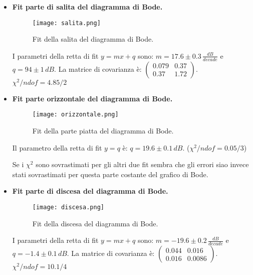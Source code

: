 \documentclass[10pt,a4paper]{article}
\begin{document}
\begin{itemize}
\item \textbf{Fit parte di salita del diagramma di Bode.}

\begin{figure}[!htb]
  \centering
  \texttt{[image: salita.png]}
\caption{Fit della salita del diagramma di Bode.}
\label{salita}
\end{figure}

I parametri della retta di fit $y = mx+q$ sono: $m = 17.6 \pm 0.3 \, \frac{dB}{decade}$ e $q = 94 \pm 1 \, dB$. La matrice di covarianza è:
$\left( \begin{array}{cc}
0.079 & 0.37 \\ 
0.37 & 1.72
\end{array} \right)$.\\
$\chi^2/ndof = 4.85/2$

\item \textbf{Fit parte orizzontale del diagramma di Bode.}

\begin{figure}[!htb]
  \centering
  \texttt{[image: orizzontale.png]}
\caption{Fit della parte piatta del diagramma di Bode.}
\label{orizz}
\end{figure}

Il parametro della retta di fit $y = q$ è: $q =19.6  \pm 0.1\, dB$. ($\chi^2/ndof = 0.05/3$) 

Se i $\chi^2$ sono sovrastimati per gli altri due fit sembra che gli errori siao invece stati sovrastimati per questa parte costante del grafico di Bode.


\item \textbf{Fit parte di discesa del diagramma di Bode.}

\begin{figure}[!htb]
  \centering
  \texttt{[image: discesa.png]}
\caption{Fit della discesa del diagramma di Bode.}
\label{discesa}
\end{figure}

I parametri della retta di fit $y = mx+q$ sono: $m = -19.6 \pm 0.2 \, \frac{dB}{decade}$ e $q = -1.4 \pm 0.1 \, dB$. La matrice di covarianza è:
$\left( \begin{array}{cc}
0.044 & 0.016 \\ 
0.016 & 0.0086
\end{array} \right)
$.\\
$\chi^2/ndof = 10.1/4$

\end{itemize}
\end{document}
